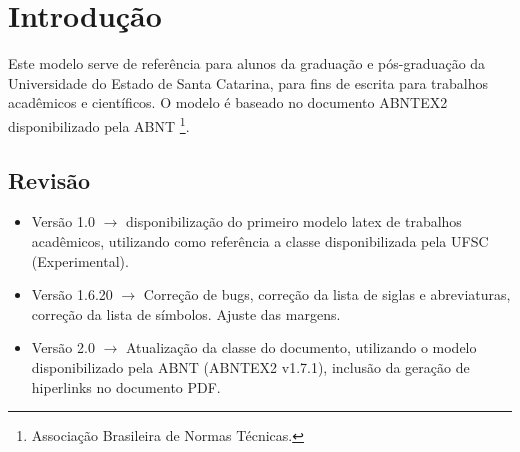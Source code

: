 \chapter{Introdução}

Este modelo serve de referência para alunos da graduação e pós-graduação da Universidade do Estado de Santa Catarina, para fins de escrita para trabalhos acadêmicos e científicos. O modelo é baseado no documento ABNTEX2 disponibilizado pela ABNT \footnote{Associação Brasileira de Normas Técnicas.}.

\section{Revisão}

\begin{itemize}
\item Versão 1.0 $\rightarrow$ disponibilização do primeiro modelo latex de trabalhos acadêmicos, utilizando como referência a classe disponibilizada pela UFSC (Experimental).
\item Versão 1.6.20 $\rightarrow$ Correção de bugs, correção da lista de siglas e abreviaturas, correção da lista de símbolos. Ajuste das margens.
\item Versão 2.0 $\rightarrow$ Atualização da classe do documento, utilizando o modelo disponibilizado pela ABNT (ABNTEX2 v1.7.1), inclusão da geração de hiperlinks no documento PDF.
\end{itemize}